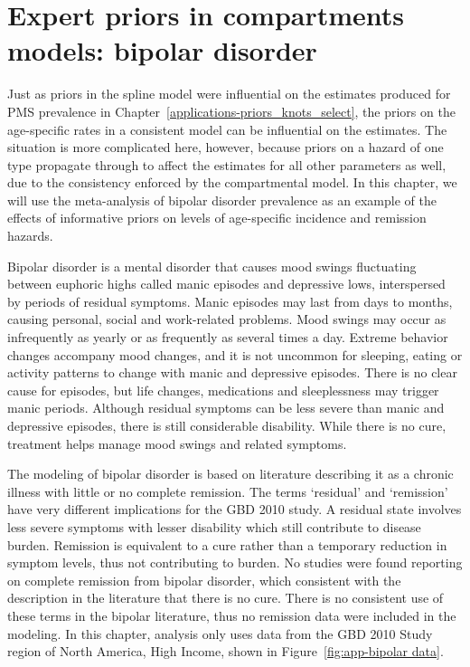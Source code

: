 \chapter{Expert priors in compartments models: bipolar disorder}
\label{applications-prior_level_vals}

Just as priors in the spline model were influential on the estimates
produced for PMS prevalence in
Chapter~\ref{applications-priors_knots_select}, the priors on the
age-specific rates in a consistent model can be influential on the
estimates.  The situation is more complicated here, however, because
priors on a hazard of one type propagate through to affect the
estimates for all other parameters as well, due to the consistency
enforced by the compartmental model.  In this chapter, we will use the
meta-analysis of bipolar disorder prevalence as an example of the
effects of informative priors on levels of age-specific incidence and
remission hazards.

Bipolar disorder is a mental disorder that causes mood swings
fluctuating between euphoric highs called manic episodes and
depressive lows, interspersed by periods of residual symptoms.  Manic
episodes may last from days to months, causing personal, social and
work-related problems.  Mood swings may occur as infrequently as
yearly or as frequently as several times a day.  Extreme behavior
changes accompany mood changes, and it is not uncommon for sleeping,
eating or activity patterns to change with manic and depressive
episodes.  There is no clear cause for episodes, but life changes,
medications and sleeplessness may trigger manic periods.
Although residual symptoms can be less severe than manic
and depressive episodes, there is still considerable disability.  While there
is no cure, treatment helps manage mood swings and related
symptoms. \cite{kloos_bipolar_2011, angst_historical_2000}

The modeling of bipolar disorder is based on literature describing it
as a chronic illness with little or no complete remission.
The terms `residual' and `remission' have very different implications
for the GBD 2010 study.  A residual state involves less severe
symptoms with lesser disability which still contribute to disease
burden.  Remission is equivalent to a cure rather than a temporary
reduction in symptom levels, thus not contributing to burden.  No studies
were found reporting on complete remission from bipolar disorder,
which consistent with the description in the literature that there
is no cure. \cite{association_diagnostic_2000}
There is no consistent use of these terms in the bipolar literature, thus
no remission data were included in the modeling.  In this chapter, analysis
only uses data from the GBD 2010 Study region of North America, High Income,
shown in Figure~\ref{fig:app-bipolar data}.


